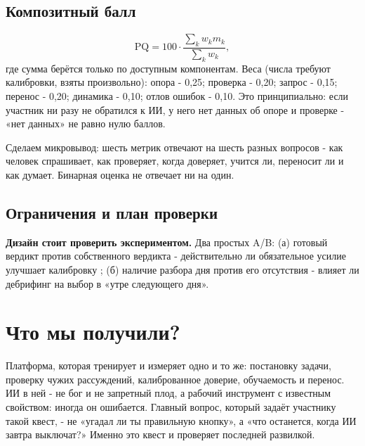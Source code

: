 \documentclass[12pt,a4paper]{article}
\begin{document}
\subsection{Композитный балл}

\[
\mathrm{PQ}=100\cdot\frac{\sum_k w_k m_k}{\sum_k w_k},
\]
где сумма берётся только по доступным компонентам. Веса (числа требуют калибровки, взяты произвольно): опора - 0,25; проверка - 0,20; запрос - 0,15; перенос - 0,20; динамика - 0,10; отлов ошибок - 0,10. Это принципиально: если участник ни разу не обратился к ИИ, у него нет данных об опоре и проверке - «нет данных» не равно нулю баллов. 

Сделаем микровывод: шесть метрик отвечают на шесть разных вопросов - как человек спрашивает, как проверяет, когда доверяет, учится ли, переносит ли и как думает. Бинарная оценка не отвечает ни на один.

\subsection{Ограничения и план проверки}

\textbf{Дизайн стоит проверить экспериментом.} Два простых A/B: (а) готовый вердикт против собственного вердикта - действительно ли обязательное усилие улучшает калибровку \cite{bucinca2025}; (б) наличие разбора дня против его отсутствия - влияет ли дебрифинг на выбор в «утре следующего дня».

\section{Что мы получили?}

Платформа, которая тренирует и измеряет одно и то же: постановку задачи, проверку чужих рассуждений, калиброванное доверие, обучаемость и перенос. ИИ в ней - не бог и не запретный плод, а рабочий инструмент с известным свойством: иногда он ошибается. Главный вопрос, который задаёт участнику такой квест, - не «угадал ли ты правильную кнопку», а «что останется, когда ИИ завтра выключат?» Именно это квест и проверяет последней развилкой. 
\end{document}
